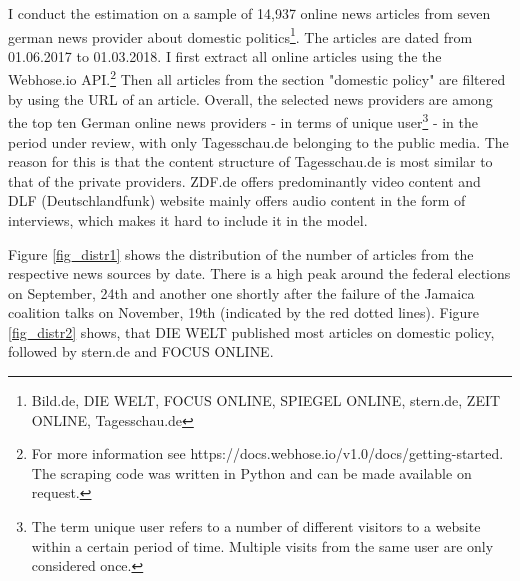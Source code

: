 \documentclass[12pt,a4paper,notitlepage]{article}
\begin{document}
I conduct the estimation on a sample of 14,937 online news articles from seven german news provider about domestic politics\footnote{Bild.de, DIE WELT, FOCUS ONLINE, SPIEGEL ONLINE, stern.de, ZEIT ONLINE, Tagesschau.de}.  The articles are dated from 01.06.2017 to 01.03.2018. I first extract all online articles using the the Webhose.io API.\footnote{For more information see https://docs.webhose.io/v1.0/docs/getting-started. The scraping code was written in Python and can be made available on request.} Then all articles from the section "domestic policy" are filtered by using the URL of an article. Overall, the selected news providers are among the top ten German online news providers - in terms of unique user\footnote{The term unique user refers to a number of different visitors to a website within a certain period of time. Multiple visits from the same user are only considered once.} - in the period under review, with only Tagesschau.de belonging to the public media. The reason for this is that the content structure of Tagesschau.de is most similar to that of the private providers. ZDF.de offers predominantly video content and DLF (Deutschlandfunk) website mainly offers audio content in the form of interviews, which makes it hard to include it in the model. 

 Figure \ref{fig_distr1} shows the distribution of the number of articles from the respective news sources by date.  There is a high peak around the federal elections on September, 24th and another one shortly after the failure of the Jamaica coalition talks on November, 19th (indicated by the red dotted lines). Figure \ref{fig_distr2} shows, that DIE WELT published most articles on domestic policy, followed by stern.de and FOCUS ONLINE.  
\end{document}
